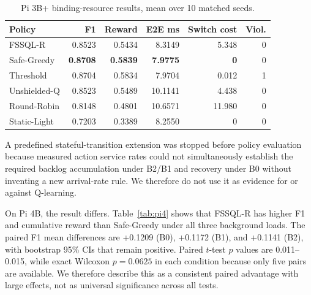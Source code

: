 \documentclass[journal]{IEEEtran}
\begin{document}
\begin{table}[t]
\caption{Pi 3B+ binding-resource results, mean over 10 matched seeds.}
\label{tab:pi3}
\centering\footnotesize
\begin{tabular}{lrrrrr}
\toprule
Policy & F1 & Reward & E2E ms & Switch cost & Viol. \\
\midrule
FSSQL-R & 0.8523 & 0.5434 & 8.3149 & 5.348 & 0 \\
Safe-Greedy & \textbf{0.8708} & \textbf{0.5839} & \textbf{7.9775} & \textbf{0} & 0 \\
Threshold & 0.8704 & 0.5834 & 7.9704 & 0.012 & 1 \\
Unshielded-Q & 0.8523 & 0.5489 & 10.1141 & 4.438 & 0 \\
Round-Robin & 0.8148 & 0.4801 & 10.6571 & 11.980 & 0 \\
Static-Light & 0.7203 & 0.3389 & 8.2550 & 0 & 0 \\
\bottomrule
\end{tabular}
\end{table}

A predefined stateful-transition extension was stopped before policy evaluation because measured action service rates could not simultaneously establish the required backlog accumulation under B2/B1 and recovery under B0 without inventing a new arrival-rate rule. We therefore do not use it as evidence for or against Q-learning.

On Pi 4B, the result differs. Table~\ref{tab:pi4} shows that FSSQL-R has higher F1 and cumulative reward than Safe-Greedy under all three background loads. The paired F1 mean differences are +0.1209 (B0), +0.1172 (B1), and +0.1141 (B2), with bootstrap 95\% CIs that remain positive. Paired $t$-test $p$ values are 0.011--0.015, while exact Wilcoxon $p=0.0625$ in each condition because only five pairs are available. We therefore describe this as a consistent paired advantage with large effects, not as universal significance across all tests.
\end{document}
